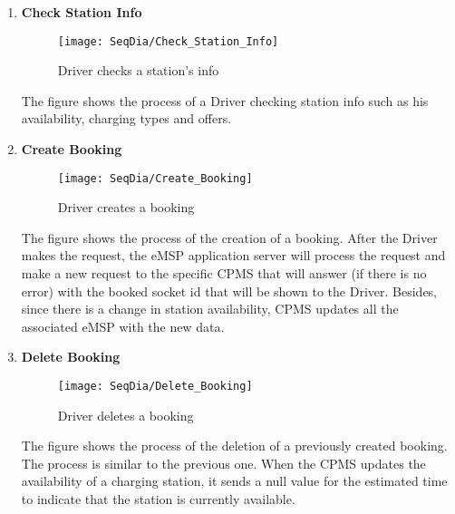 \begin{enumerate}
        \newpage
        \item \textbf{Check Station Info}
        \begin{figure}[H]
            \begin{center}
            \texttt{[image: SeqDia/Check\_Station\_Info]}
            \caption{Driver checks a station's info}
            \label{fig:CheckStationInfo}
            \end{center}
        \end{figure}
        The figure shows the process of a Driver checking station info such as his availability, charging types and offers.
        \newpage
        \item \textbf{Create Booking}
        \begin{figure}[H]
            \begin{center}
            \texttt{[image: SeqDia/Create\_Booking]}
            \caption{Driver creates a booking}
            \label{fig:CreateBooking}
            \end{center}
        \end{figure}
        The figure shows the process of the creation of a booking. After the Driver makes the request, the eMSP application server will process the request and make a new request to the specific CPMS that will answer (if there is no error) with the booked socket id that will be shown to the Driver. Besides, since there is a change in station availability, CPMS updates all the associated eMSP with the new data.
        \newpage
        \item \textbf{Delete Booking}
        \begin{figure}[H]
            \begin{center}
            \texttt{[image: SeqDia/Delete\_Booking]}
            \caption{Driver deletes a booking}
            \label{fig:DeleteBooking}
            \end{center}
        \end{figure}
        The figure shows the process of the deletion of a previously created booking. The process is similar to the previous one. When the CPMS updates the availability of a charging station, it sends a null value for the estimated time to indicate that the station is currently available.

\end{enumerate}
